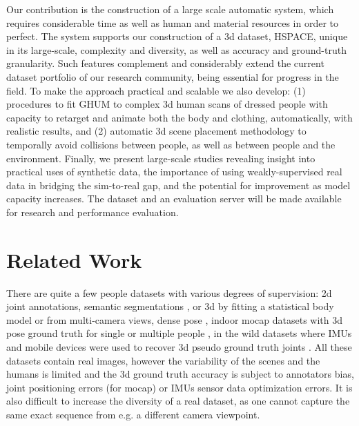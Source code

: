 \documentclass[10pt,twocolumn,letterpaper]{article}
\begin{document}
Our contribution is the construction of a large scale automatic system, which requires considerable time as well as human and material resources in order to perfect. The system supports our construction of a 3d dataset, HSPACE, unique in its large-scale, complexity and diversity, as well as accuracy and ground-truth granularity. Such features complement and considerably extend the current dataset portfolio of our research community, being essential for progress in the field. To make the approach practical and scalable we also develop: (1) procedures to fit GHUM to complex 3d human scans of dressed people with capacity to retarget and animate both the body and clothing, automatically, with realistic results, and (2) automatic 3d scene placement methodology to temporally avoid collisions between people, as well as between people and the environment. Finally, we present large-scale studies revealing insight into practical uses of synthetic data, the importance of using weakly-supervised real data in bridging the sim-to-real gap, and the potential for improvement as model capacity increases. The dataset and an evaluation server will be made available for research and performance evaluation.

\section{Related Work}
    There are quite a few people datasets with various degrees of supervision: 2d joint
annotations, semantic segmentations \cite{MsCOCO, OpenImages}, or 3d by fitting a statistical body model or from multi-camera views\cite{zhang2020object, STRAPS2020BMVC, joo2020exemplar, mehta2017monocular},  dense pose \cite{Guler2018DensePose}, indoor mocap datasets with 3d pose ground truth for single or multiple people \cite{sigal2010humaneva, Ionescu14pami, Fieraru_2020_CVPR, fieraru2020three, fieraru2021learning, fieraru2021aifit}, in the wild datasets where IMUs and mobile devices were used to recover 3d pseudo ground truth joints \cite{vonMarcard2018}. All these datasets contain real images, however the variability of the scenes and the humans is limited and the 3d ground truth accuracy is subject to annotators bias, joint positioning errors (for mocap) or IMUs sensor data optimization errors. It is also difficult to increase the diversity of a real dataset, as one cannot capture the same exact sequence from e.g. a different camera viewpoint. 
\end{document}
